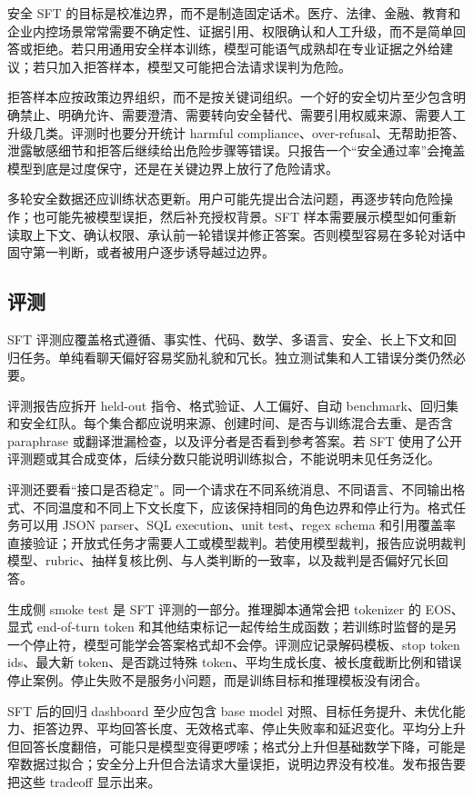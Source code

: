 \documentclass[UTF8,zihao=-4,openany]{ctexbook}
\begin{document}
安全 SFT 的目标是校准边界，而不是制造固定话术。医疗、法律、金融、教育和企业内控场景常常需要不确定性、证据引用、权限确认和人工升级，而不是简单回答或拒绝。若只用通用安全样本训练，模型可能语气成熟却在专业证据之外给建议；若只加入拒答样本，模型又可能把合法请求误判为危险。

拒答样本应按政策边界组织，而不是按关键词组织。一个好的安全切片至少包含明确禁止、明确允许、需要澄清、需要转向安全替代、需要引用权威来源、需要人工升级几类。评测时也要分开统计 harmful compliance、over-refusal、无帮助拒答、泄露敏感细节和拒答后继续给出危险步骤等错误。只报告一个“安全通过率”会掩盖模型到底是过度保守，还是在关键边界上放行了危险请求。

多轮安全数据还应训练状态更新。用户可能先提出合法问题，再逐步转向危险操作；也可能先被模型误拒，然后补充授权背景。SFT 样本需要展示模型如何重新读取上下文、确认权限、承认前一轮错误并修正答案。否则模型容易在多轮对话中固守第一判断，或者被用户逐步诱导越过边界。

\subsection{评测}
SFT 评测应覆盖格式遵循、事实性、代码、数学、多语言、安全、长上下文和回归任务。单纯看聊天偏好容易奖励礼貌和冗长。独立测试集和人工错误分类仍然必要。

评测报告应拆开 held-out 指令、格式验证、人工偏好、自动 benchmark、回归集和安全红队。每个集合都应说明来源、创建时间、是否与训练混合去重、是否含 paraphrase 或翻译泄漏检查，以及评分者是否看到参考答案。若 SFT 使用了公开评测题或其合成变体，后续分数只能说明训练拟合，不能说明未见任务泛化。

评测还要看“接口是否稳定”。同一个请求在不同系统消息、不同语言、不同输出格式、不同温度和不同上下文长度下，应该保持相同的角色边界和停止行为。格式任务可以用 JSON parser、SQL execution、unit test、regex schema 和引用覆盖率直接验证；开放式任务才需要人工或模型裁判。若使用模型裁判，报告应说明裁判模型、rubric、抽样复核比例、与人类判断的一致率，以及裁判是否偏好冗长回答。

生成侧 smoke test 是 SFT 评测的一部分。推理脚本通常会把 tokenizer 的 EOS、显式 end-of-turn token 和其他结束标记一起传给生成函数；若训练时监督的是另一个停止符，模型可能学会答案格式却不会停。评测应记录解码模板、stop token ids、最大新 token、是否跳过特殊 token、平均生成长度、被长度截断比例和错误停止案例。停止失败不是服务小问题，而是训练目标和推理模板没有闭合。

SFT 后的回归 dashboard 至少应包含 base model 对照、目标任务提升、未优化能力、拒答边界、平均回答长度、无效格式率、停止失败率和延迟变化。平均分上升但回答长度翻倍，可能只是模型变得更啰嗦；格式分上升但基础数学下降，可能是窄数据过拟合；安全分上升但合法请求大量误拒，说明边界没有校准。发布报告要把这些 tradeoff 显示出来。
\end{document}
